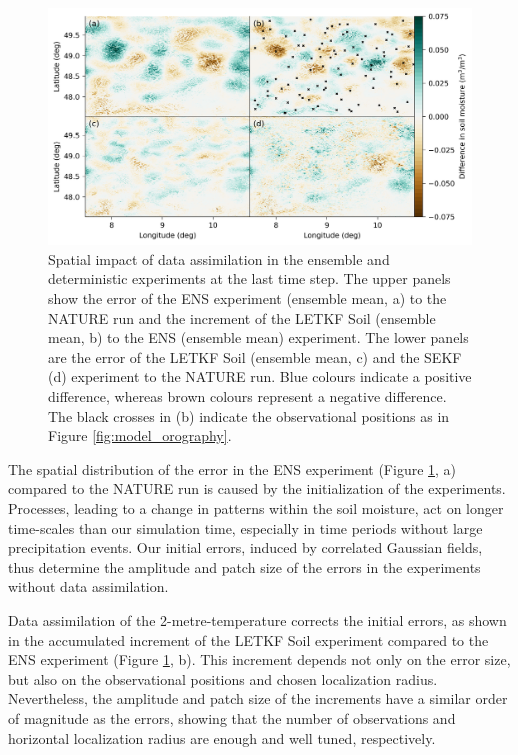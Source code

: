 \documentclass[hess, manuscript]{copernicus}
\begin{document}
\begin{figure}[ht]
	\includegraphics{figures/fig_06_spatial_impact.png}
	\caption{
		Spatial impact of data assimilation in the ensemble and deterministic experiments at the last time step.
		The upper panels show the error of the ENS experiment (ensemble mean, a) to the NATURE run and the increment of the LETKF Soil (ensemble mean, b) to the ENS (ensemble mean) experiment.
		The lower panels are the error of the LETKF Soil (ensemble mean, c) and the SEKF (d) experiment to the NATURE run.
		Blue colours indicate a positive difference, whereas brown colours represent a negative difference.
		The black crosses in (b) indicate the observational positions as in Figure \ref{fig:model_orography}.
	}
	\label{fig:spatial_impact}
\end{figure}


The spatial distribution of the error in the ENS experiment (Figure \ref{fig:spatial_impact}, a) compared to the NATURE run is caused by the initialization of the experiments.
Processes, leading to a change in patterns within the soil moisture, act on longer time-scales than our simulation time, especially in time periods without large precipitation events.
Our initial errors, induced by correlated Gaussian fields, thus determine the amplitude and patch size of the errors in the experiments without data assimilation.

Data assimilation of the 2-metre-temperature corrects the initial errors, as shown in the accumulated increment of the LETKF Soil experiment compared to the ENS experiment (Figure \ref{fig:spatial_impact}, b).
This increment depends not only on the error size, but also on the observational positions and chosen localization radius.
Nevertheless, the amplitude and patch size of the increments have a similar order of magnitude as the errors, showing that the number of observations and horizontal localization radius are enough and well tuned, respectively.
\end{document}
